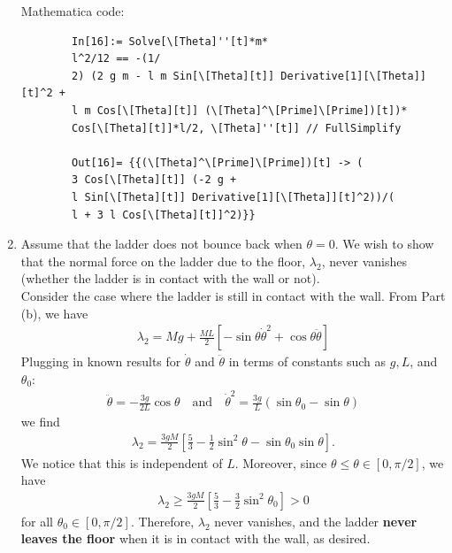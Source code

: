 \documentclass{article}
\theoremstyle{definition}
\newcommand{\f}[2]{\frac{#1}{#2}}
\newcommand{\lb}{\left[}
\newcommand{\rb}{\right]}
\begin{document}
\begin{enumerate}[label = (\alph*)]
		Mathematica code:
		\begin{lstlisting}
		In[16]:= Solve[\[Theta]''[t]*m*
		l^2/12 == -(1/
		2) (2 g m - l m Sin[\[Theta][t]] Derivative[1][\[Theta]][t]^2 + 
		l m Cos[\[Theta][t]] (\[Theta]^\[Prime]\[Prime])[t])*
		Cos[\[Theta][t]]*l/2, \[Theta]''[t]] // FullSimplify
		
		Out[16]= {{(\[Theta]^\[Prime]\[Prime])[t] -> (
		3 Cos[\[Theta][t]] (-2 g + 
		l Sin[\[Theta][t]] Derivative[1][\[Theta]][t]^2))/(
		l + 3 l Cos[\[Theta][t]]^2)}}
		\end{lstlisting}
		
		
		\item Assume that the ladder does not bounce back when $\theta = 0$. We wish to show that the normal force on the ladder due to the floor, $\lambda_2$, never vanishes (whether the ladder is in contact with the wall or not). \\
		
		Consider the case where the ladder is still in contact with the wall. From Part (b), we have
		\begin{align*}
		\lambda_2 = Mg + \f{ML}{2}\lb -\sin\theta \dot\theta^2 + \cos\theta \ddot\theta \rb
		\end{align*}
		Plugging in known results for $\dot\theta$ and $\ddot\theta$ in terms of constants such as $g,L$, and $\theta_0$:
		\begin{align*}
		\ddot\theta  = -\f{3g}{2L}\cos\theta \quad\text{and}\quad \dot\theta^2 = \f{3g}{L}(\sin\theta_0-\sin\theta)
		\end{align*}
		we find 
		\begin{align*}
		\lambda_2 = \f{3gM}{2}\lb \f{5}{3} - \f{1}{2}\sin^2\theta - \sin\theta_0 \sin\theta \rb.
		\end{align*}
		We notice that this is independent of $L$. Moreover, since $\theta \leq \theta \in [0,\pi/2]$, we have
		\begin{align*}
		\lambda_2 \geq \f{3gM}{2}\lb \f{5}{3} - \f{3}{2}\sin^2\theta_0 \rb > 0
		\end{align*}
		for all $\theta_0 \in [0,\pi/2]$. Therefore, $\lambda_2$ never vanishes, and the ladder \textbf{never leaves the floor} when it is in contact with the wall, as desired. \\ 
		
		
		

\end{enumerate}
\end{document}
